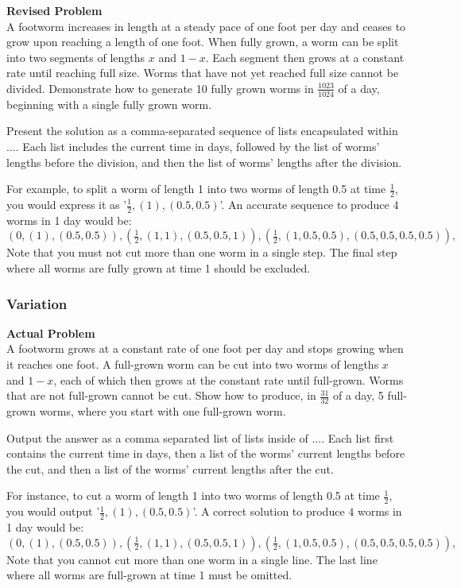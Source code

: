\textbf{Revised Problem}\\
A footworm increases in length at a steady pace of one foot per day and ceases to grow upon reaching a length of one foot. When fully grown, a worm can be split into two segments of lengths $x$ and $1-x$. Each segment then grows at a constant rate until reaching full size. Worms that have not yet reached full size cannot be divided. Demonstrate how to generate 10 fully grown worms in $\frac{1023}{1024}$ of a day, beginning with a single fully grown worm.

Present the solution as a comma-separated sequence of lists encapsulated within $\boxed{...}$. Each list includes the current time in days, followed by the list of worms' lengths before the division, and then the list of worms' lengths after the division.

For example, to split a worm of length 1 into two worms of length 0.5 at time $\frac{1}{2}$, you would express it as '$\frac{1}{2}, (1), (0.5, 0.5)$'. An accurate sequence to produce 4 worms in 1 day would be:
$\boxed{
    (0, (1), (0.5, 0.5)),
    (\frac{1}{2}, (1, 1), (0.5, 0.5, 1)),
    (\frac{1}{2}, (1, 0.5, 0.5), (0.5, 0.5, 0.5, 0.5)),
}$
Note that you must not cut more than one worm in a single step. The final step where all worms are fully grown at time 1 should be excluded.

\subsubsection{Variation}
\textbf{Actual Problem}\\
A footworm grows at a constant rate of one foot per day and stops growing when it reaches one foot. A full-grown worm can be cut into two worms of lengths $x$ and $1-x$, each of which then grows at the constant rate until full-grown. Worms that are not full-grown cannot be cut. Show how to produce, in $\frac{31}{32}$ of a day, 5 full-grown worms, where you start with one full-grown worm.

Output the answer as a comma separated list of lists inside of $\boxed{...}$. Each list first contains the current time in days, then a list of the worms' current lengths before the cut, and then a list of the worms' current lengths after the cut.

For instance, to cut a worm of length 1 into two worms of length 0.5 at time $\frac{1}{2}$, you would output '$\frac{1}{2}, (1), (0.5, 0.5)$'. A correct solution to produce $4$ worms in 1 day would be:
$\boxed{
    (0, (1), (0.5, 0.5)),
    (\frac{1}{2}, (1, 1), (0.5, 0.5, 1)),
    (\frac{1}{2}, (1, 0.5, 0.5), (0.5, 0.5, 0.5, 0.5)),
}$
Note that you cannot cut more than one worm in a single line. The last line where all worms are full-grown at time 1 must be omitted.

